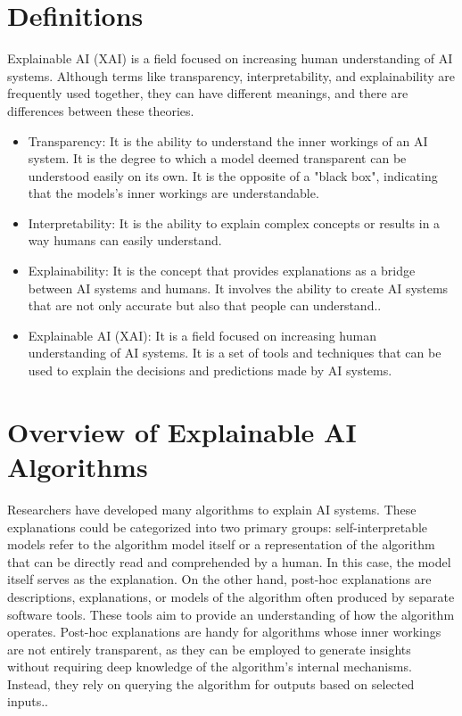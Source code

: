 \documentclass[10pt,journal,compsoc]{IEEEtran}
\begin{document}
\section{Definitions}

Explainable AI (XAI) is a field focused on increasing human understanding of AI systems. Although terms like transparency, interpretability, and explainability are frequently used together, they can have different meanings, and there are differences between these theories.\cite{antoniadi2021current}

\begin{itemize}
    \item {Transparency}: It is the ability to understand the inner workings of an AI system. It is the degree to which 
    a model deemed transparent can be understood easily on its own. It is the opposite of a "black box", indicating that the models's inner workings are understandable\cite{transparency}.
    \item {Interpretability}: It is the ability to explain complex concepts or results in a way humans can easily understand\cite{gilpin2019explaining}.
    \item {Explainability}: It is the concept that provides explanations as a bridge between AI systems and humans. It involves the ability to create AI systems that are not only accurate but also that people can understand.\cite{gilpin2019explaining}.
    \item {Explainable AI (XAI)}: It is a field focused on increasing human understanding of AI systems. It is a set of tools and techniques that can be used to explain the decisions and predictions made by AI systems.\cite{antoniadi2021current}
    
   \end{itemize}

\section{Overview of Explainable AI Algorithms}
Researchers have developed many algorithms to explain AI systems. These explanations could be categorized into two primary groups: self-interpretable models refer to the algorithm model itself or a representation of the algorithm that can be directly read and comprehended by a human. In this case, the model itself serves as the explanation. On the other hand, post-hoc explanations are descriptions, explanations, or models of the algorithm often produced by separate software tools. These tools aim to provide an understanding of how the algorithm operates. Post-hoc explanations are handy for algorithms whose inner workings are not entirely transparent, as they can be employed to generate insights without requiring deep knowledge of the algorithm's internal mechanisms. Instead, they rely on querying the algorithm for outputs based on selected inputs.\cite{phillips2020four}.
\end{document}
